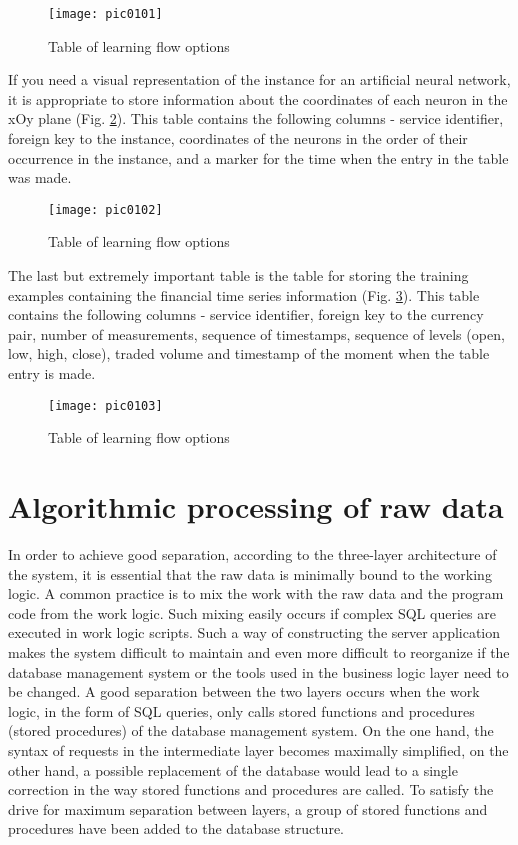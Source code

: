 \begin{figure}[h]
\centering
\texttt{[image: pic0101]}
\caption{Table of learning flow options}
\label{fig:pic0101}
\end{figure}
\FloatBarrier

If you need a visual representation of the instance for an artificial neural network, it is appropriate to store information about the coordinates of each neuron in the xOy plane (Fig. \ref{fig:pic0102}). This table contains the following columns - service identifier, foreign key to the instance, coordinates of the neurons in the order of their occurrence in the instance, and a marker for the time when the entry in the table was made.

\begin{figure}[h]
\centering
\texttt{[image: pic0102]}
\caption{Table of learning flow options}
\label{fig:pic0102}
\end{figure}
\FloatBarrier

The last but extremely important table is the table for storing the training examples containing the financial time series information (Fig. \ref{fig:pic0103}). This table contains the following columns - service identifier, foreign key to the currency pair, number of measurements, sequence of timestamps, sequence of levels (open, low, high, close), traded volume and timestamp of the moment when the table entry is made.

\begin{figure}[h]
\centering
\texttt{[image: pic0103]}
\caption{Table of learning flow options}
\label{fig:pic0103}
\end{figure}
\FloatBarrier

\section{Algorithmic processing of raw data}

In order to achieve good separation, according to the three-layer architecture of the system, it is essential that the raw data is minimally bound to the working logic. A common practice is to mix the work with the raw data and the program code from the work logic. Such mixing easily occurs if complex SQL queries are executed in work logic scripts. Such a way of constructing the server application makes the system difficult to maintain and even more difficult to reorganize if the database management system or the tools used in the business logic layer need to be changed. A good separation between the two layers occurs when the work logic, in the form of SQL queries, only calls stored functions and procedures (stored procedures) of the database management system. On the one hand, the syntax of requests in the intermediate layer becomes maximally simplified, on the other hand, a possible replacement of the database would lead to a single correction in the way stored functions and procedures are called. To satisfy the drive for maximum separation between layers, a group of stored functions and procedures have been added to the database structure.


